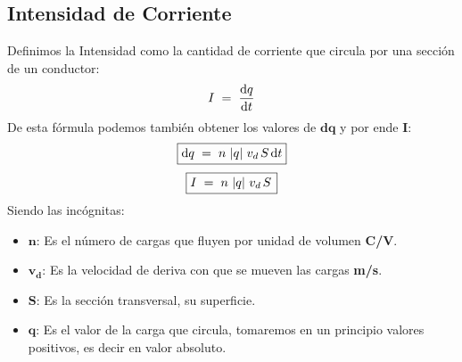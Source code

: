 
\subsection{Intensidad de Corriente}
\begin{wrapfigure}{r}{3cm}
\end{wrapfigure}
\noindent Definimos la Intensidad como la cantidad de corriente que circula por una sección de un conductor:
\[
        I \hspace{1mm}= \hspace{1mm} \frac{\mathrm{d}q }{\mathrm{d} t}
\]
\noindent De esta fórmula podemos también obtener los valores de \(\mathbf{d}\bm{q}\) y por ende \textbf{I}:
\[
        \boxed{\mathrm{d}q \hspace{1mm}= \hspace{1mm} n\hspace{.5mm}\left | q\right |\hspace{.5mm}v_d\hspace{.5mm}S\hspace{.5mm}\mathrm{d}t}
\]
\[
        \boxed{I \hspace{1mm}= \hspace{1mm} n\hspace{.5mm}\left | q\right |\hspace{.5mm}v_d\hspace{.5mm}S\hspace{.5mm}}
\]
Siendo las incógnitas:
\begin{itemize}
        \item \(\bm{n}\): Es el número de cargas que fluyen por unidad de volumen \textbf{C/V}.
        \item \(\bm{v_d}\): Es la velocidad de deriva con que se mueven las cargas \textbf{m/s}.
        \item \(\bm{S}\): Es la sección transversal, su superficie.
        \item \(\bm{q}\): Es el valor de la carga que circula, tomaremos en un principio valores positivos, es decir en valor absoluto.
\end{itemize}
